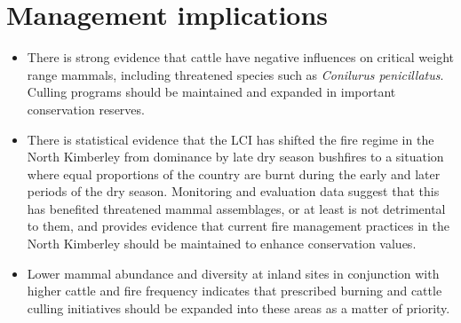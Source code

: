 \documentclass[version=last,
    paper=a4, %
    10pt, %
    usenames,
    dvipsnames,
    oneside, %
    headings=openany, %
    DIV=15 %
]{scrbook}
\begin{document}
\section*{Management implications}
\begin{itemize}
\itemsep1pt\parskip0pt
\item
  There is strong evidence that cattle have negative influences on
  critical weight range mammals, including threatened species such as
  \emph{Conilurus penicillatus}. Culling programs should be maintained
  and expanded in important conservation reserves.
\item
  There is statistical evidence that the LCI has shifted the fire regime
  in the North Kimberley from dominance by late dry season bushfires to
  a situation where equal proportions of the country are burnt during
  the early and later periods of the dry season. Monitoring and
  evaluation data suggest that this has benefited threatened mammal
  assemblages, or at least is not detrimental to them, and provides
  evidence that current fire management practices in the North Kimberley
  should be maintained to enhance conservation values.
\item
  Lower mammal abundance and diversity at inland sites in conjunction
  with higher cattle and fire frequency indicates that prescribed
  burning and cattle culling initiatives should be expanded into these
  areas as a matter of priority.
\end{itemize}
\end{document}
